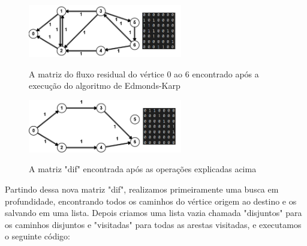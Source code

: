\begin{figure}[ht]
	\centering	
	\caption[\hspace{0.1cm}Fluxo Residual.]{A matriz do fluxo residual do vértice 0 ao 6 encontrado após a execução do algoritmo de Edmonds-Karp}
	\vspace{-0.4cm}
	\includegraphics[width=0.6\textwidth]{figuras/fluxo.png}
	 \vspace{-0.2cm}
	\label{fig:figura2}
\end{figure}
\vspace{-0.5cm}

\begin{figure}[ht]
	\centering	
	\caption[\hspace{0.1cm}Fluxo Residual.]{A matriz "dif" encontrada após as operações explicadas acima}
	\vspace{-0.4cm}
	\includegraphics[width=0.6\textwidth]{figuras/dif.png}
	 \vspace{-0.2cm}
	\label{fig:figura3}
\end{figure}


Partindo dessa nova matriz "dif", realizamos primeiramente uma busca em profundidade, encontrando todos os caminhos do vértice origem ao destino e os salvando em uma lista. Depois criamos uma lista vazia chamada "disjuntos" para os caminhos disjuntos e "visitadas" para todas as arestas visitadas, e executamos o seguinte código:


